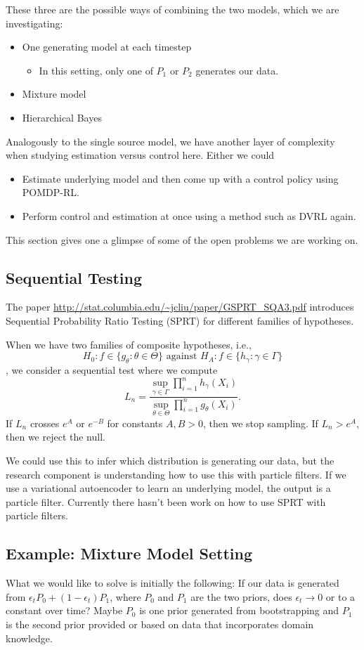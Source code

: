 \documentclass[english]{article}
\numberwithin{equation}{section}
\begin{document}
	These three are the possible ways of combining the two models, which we are investigating:
	\begin{itemize}
		\item One generating model at each timestep
			\begin{itemize}
				\item In this setting, only one of $P_1$ or $P_2$ generates our data.
			\end{itemize}
		\item Mixture model
		\item Hierarchical Bayes
	\end{itemize}
	
	Analogously to the single source model, we have another layer of complexity when studying estimation versus control here. Either we could
	\begin{itemize}
		\item Estimate underlying model and then come up with a control policy using POMDP-RL.
		\item Perform control and estimation at once using a method such as DVRL again.
	\end{itemize}
	
	This section gives one a glimpse of some of the open problems we are working on.
	
	\subsection*{Sequential Testing}
	The paper \url{http://stat.columbia.edu/~jcliu/paper/GSPRT_SQA3.pdf} introduces Sequential Probability Ratio Testing (SPRT) for different families of hypotheses.
	
	When we have two families of composite hypotheses, i.e.,
	$$H_0: f\in \{g_{\theta}:\theta\in \Theta\} \textrm{ against } H_A:f\in \{h_{\gamma}:\gamma\in \Gamma\}$$, we consider a sequential test where we compute $$L_n = \frac{\sup_{\gamma\in \Gamma} \prod_{i=1}^n h_{\gamma}(X_i)}{\sup_{\theta\in \Theta} \prod_{i=1}^n g_{\theta}(X_i)}.$$ If $L_n$ crosses $e^A$ or $e^{-B}$ for constants $A,B>0$, then we stop sampling. If $L_n>e^A$, then we reject the null.
	
	We could use this to infer which distribution is generating our data, but the research component is understanding how to use this with particle filters. If we use a variational autoencoder to learn an underlying model, the output is a particle filter. Currently there hasn't been work on how to use SPRT with particle filters.
	\subsection*{Example: Mixture Model Setting}
	What we would like to solve is initially the following:
	If our data is generated from $\epsilon_t P_0 + (1-\epsilon_t) P_1$, where $P_0$ and $P_1$ are the two priors, does $\epsilon_t\to 0$ or to a constant over time? Maybe $P_0$ is one prior generated from bootstrapping and $P_1$ is the second prior provided or based on data that incorporates domain knowledge.
	
\end{document}
